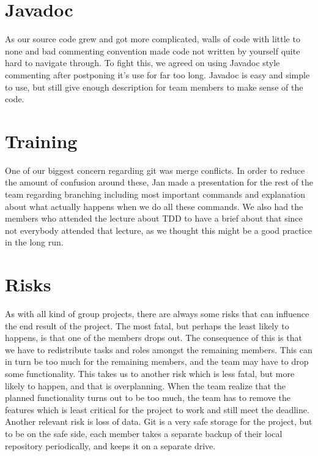 \documentclass{article}
\begin{document}
\section*{Javadoc}
As our source code grew and got more complicated, walls of code with little to none and bad commenting convention made code not written by yourself quite hard to navigate through. To fight this, we agreed on using Javadoc style commenting after postponing it's use for far too long. Javadoc is easy and simple to use, but still give enough description for team members to make sense of the code.

\newpage
\section*{Training}
One of our biggest concern regarding git was merge conflicts. In order to reduce the amount of confusion around these, Jan made a presentation for the rest of the team regarding branching including most important commands and explanation about what actually happens when we do all these commands.
We also had the members who attended the lecture about TDD to have a brief about that since not everybody attended that lecture, as we thought this might be a good practice in the long run.

\section*{Risks}
As with all kind of group projects, there are always some risks that can influence the end result of the project. The most fatal, but perhaps the least likely to happens, is that one of the members drops out. The consequence of this is that we have to redistribute tasks and roles amongst the remaining members. This can in turn be too much for the remaining members, and the team may have to drop some functionality. This takes us to another risk which is less fatal, but more likely to happen, and that is overplanning. When the team realize that the planned functionality turns out to be too much, the team has to remove the features which is least critical for the project to work and still meet the deadline.
Another relevant risk is loss of data. Git is a very safe storage for the project, but to be on the safe side, each member takes a separate backup of their local repository periodically, and keeps it on a separate drive.
\end{document}
